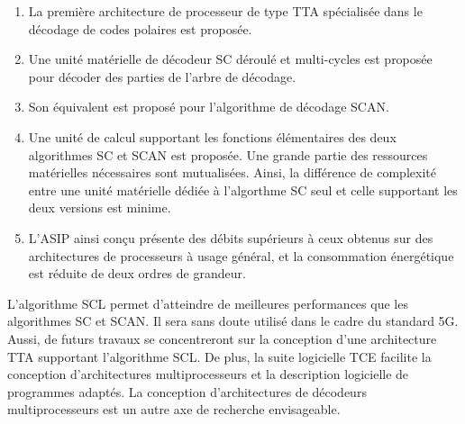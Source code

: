 \begin{enumerate}[label=(\roman*)]
  \item La première architecture de processeur de type TTA spécialisée dans le décodage de codes polaires est proposée.
  \item Une unité matérielle de décodeur SC déroulé et multi-cycles est proposée pour décoder des parties de l'arbre de décodage.
  \item Son équivalent est proposé pour l'algorithme de décodage SCAN.
  \item Une unité de calcul supportant les fonctions élémentaires des deux algorithmes SC et SCAN est proposée. Une grande partie des ressources matérielles nécessaires sont mutualisées. Ainsi, la différence de complexité entre une unité matérielle dédiée à l'algorthme SC seul et celle supportant les deux versions est minime.
  \item L'ASIP ainsi conçu présente des débits supérieurs à ceux obtenus sur des architectures de processeurs à usage général, et la consommation énergétique est réduite de deux ordres de grandeur.
\end{enumerate}

L'algorithme SCL permet d'atteindre de meilleures performances que les algorithmes SC et SCAN. Il sera sans doute utilisé dans le cadre du standard 5G. Aussi, de futurs travaux se concentreront sur la conception d'une architecture TTA supportant l'algorithme SCL. De plus, la suite logicielle TCE facilite la conception d'architectures multiprocesseurs et la description logicielle de programmes adaptés. La conception d'architectures de décodeurs multiprocesseurs est un autre axe de recherche envisageable.


